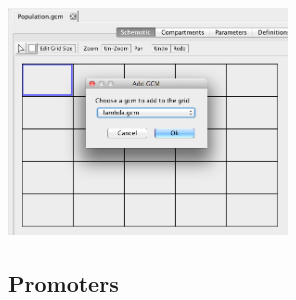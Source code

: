 \documentclass[titlepage,11pt]{article}
\begin{document}
\begin{center}
\includegraphics[height=60mm]{screenshots/addCompGrid}
\end{center}

\subsection{\label{Promoters}Promoters}
\end{document}

